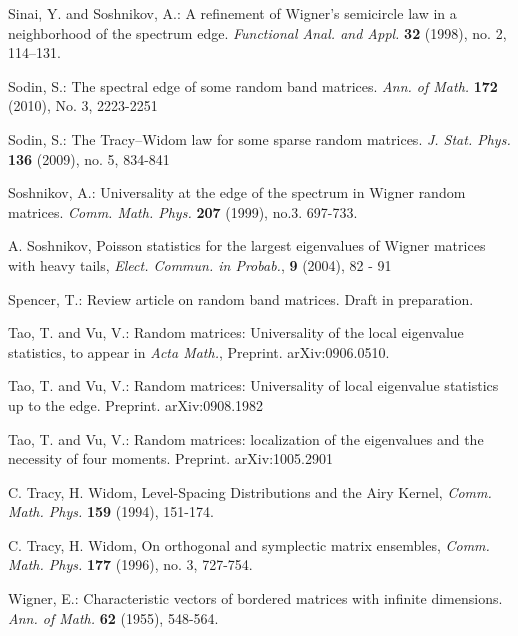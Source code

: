\documentclass[draft]{article}
\numberwithin{equation}{section}
\numberwithin{theorem}{section}
\numberwithin{definition}{section}
\numberwithin{remark}{section}
\begin{document}
 Sinai, Y. and Soshnikov, A.: 
A refinement of Wigner's semicircle law in a neighborhood of the spectrum edge.
{\it Functional Anal. and Appl.} {\bf 32} (1998), no. 2, 114--131.

 Sodin, S.: The spectral edge of some random band matrices. 
{\it Ann. of Math.} {\bf 172} (2010), No. 3, 2223-2251 


 Sodin, S.: The Tracy--Widom law for some sparse random matrices. 
{\it J. Stat. Phys.} {\bf 136} (2009), no. 5, 834-841


 Soshnikov, A.: Universality at the edge of the spectrum in
Wigner random matrices. {\it  Comm. Math. Phys.} {\bf 207} (1999), no.3.
 697-733.

  A. Soshnikov, Poisson statistics for the largest eigenvalues of 
Wigner matrices with heavy
tails, {\it Elect. Commun. in Probab.}, {\bf 9}  (2004), 82 - 91

 Spencer, T.: Review article on random band matrices. Draft in
preparation.

 
 Tao, T. and Vu, V.: Random matrices: Universality of the 
local eigenvalue statistics, to appear in {\it Acta Math.}, 
 Preprint. arXiv:0906.0510. 

 Tao, T. and Vu, V.: Random matrices: Universality 
of local eigenvalue statistics up to the edge. Preprint. arXiv:0908.1982


 Tao, T. and Vu, V.: Random  matrices: 
localization of the eigenvalues and the necessity of four moments.
Preprint. arXiv:1005.2901



  C. Tracy, H. Widom, Level-Spacing Distributions and the Airy Kernel,
{\it Comm. Math. Phys.} {\bf 159} (1994), 151-174.

   C. Tracy, H. Widom, On orthogonal and symplectic matrix ensembles,
{\it Comm. Math. Phys.} {\bf 177} (1996), no. 3, 727-754.

 Wigner, E.: Characteristic vectors of bordered matrices 
with infinite dimensions. {\it Ann. of Math.} {\bf 62} (1955), 548-564.




 
\end{document}
